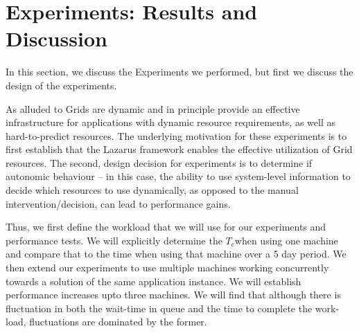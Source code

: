 \documentclass[conference,final]{IEEEtran}
\newcommand{\tc}{$T_c$}
\begin{document}


\section{Experiments: Results and Discussion}


In this section, we discuss the Experiments we performed, but first we
discuss the design of the experiments.

As alluded to Grids are dynamic and in principle provide an effective
infrastructure for applications with dynamic resource requirements, as
well as hard-to-predict resources. The underlying motivation for these
experiments is to first establish that the Lazarus framework enables
the effective utilization of Grid resources. The second, design
decision for experiments is to determine if autonomic behaviour -- in
this case, the ability to use system-level information to decide which
resources to use dynamically, as opposed to the manual
intervention/decision, can lead to performance gains.

Thus, we first define the workload that we will use for our
experiments and performance tests. We will explicitly determine the
\tc when using one machine and compare that to the time when using
that machine over a 5 day period. We then extend our experiments to
use multiple machines working concurrently towards a solution of the
same application instance.  We will establish performance increases
upto three machines.  We will find that although there is fluctuation
in both the wait-time in queue and the time to complete the work-load,
fluctuations are dominated by the former.
\end{document}
